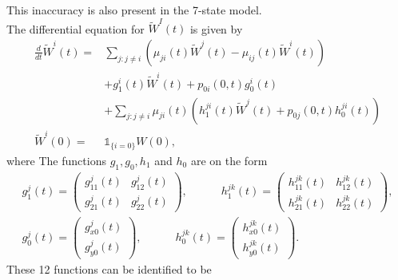 \documentclass[12pt]{article}
\newcommand{\indic}[1]{\mathds{1}_{ \{ #1 \} }}
\theoremstyle{my_thm}
\begin{document}
This inaccuracy is also present in the 7-state model.
\\[12pt]
The differential equation for $\tilde{W}^I(t)$ is given by
\begin{align*}
\frac{d}{dt}\tilde{W}^i(t)=&
\sum_{j:j \neq i} \left( \mu_{ji}(t) \tilde{W}^j(t)-\mu_{ij}(t)\tilde{W}^i(t)\right)
 \\
&+
g_1^i(t) \tilde{W}^i(t) +p_{0i}(0,t)g_0^i(t)
\\
&+
\sum_{j:j\neq i} \mu_{ji}(t) \left( h_1^{ji}(t) \tilde{W}^j(t)  + p_{0j}(0,t)h_0^{ji}(t)\right) 
\\
\tilde{W}^i(0)=&\indic{i=0}W(0) ,
\end{align*}
where
The functions $g_1,g_0,h_1$ and $h_0$ are on the form
\begin{gather*}
g^j_1(t)=\begin{pmatrix}
g^j_{11}(t) & g^j_{12}(t) \\
g^j_{21}(t) & g^j_{22}(t)
\end{pmatrix},
\qquad 
\quad
h^{jk}_1(t)=\begin{pmatrix}
h^{jk}_{11}(t) & h^{jk}_{12}(t) \\
h^{jk}_{21}(t) & h^{jk}_{22}(t)
\end{pmatrix},
\\
g_0^j(t)=\begin{pmatrix}
g^j_{x0}(t) \\
g^j_{y0}(t)
\end{pmatrix},
\qquad 
\quad
h^{jk}_0(t)=\begin{pmatrix}
h^{jk}_{x0}(t) \\
h^{jk}_{y0}(t)
\end{pmatrix}.
\end{gather*}
These 12 functions can be identified to be
\end{document}
